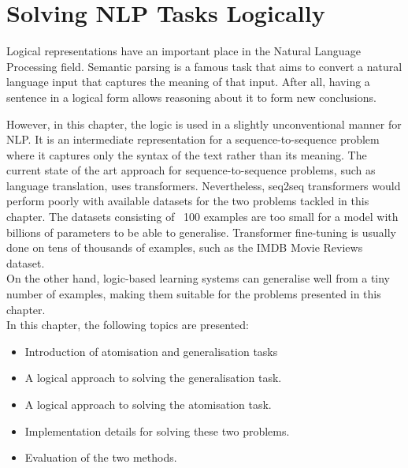 


\chapter{Solving NLP Tasks Logically}


Logical representations have an important place in the Natural Language Processing field.
Semantic parsing \cite{RefWorks:RefID:28-jurafsky2014speech} is a famous task that aims to convert a natural language input that captures the meaning of that input.
After all, having a sentence in a logical form allows reasoning about it to form new conclusions.

However, in this chapter, the logic is used in a slightly unconventional manner for NLP.
It is an intermediate representation for a sequence-to-sequence problem where it captures only the syntax of the text rather than its meaning.
The current state of the art approach for sequence-to-sequence problems, such as language translation, uses transformers. 
Nevertheless, seq2seq transformers would perform poorly with available datasets for the two problems tackled in this chapter.
The datasets consisting of ~100 examples are too small for a model with billions of parameters to be able to generalise.
Transformer fine-tuning is usually done on tens of thousands of examples, such as the IMDB Movie Reviews dataset. \\
On the other hand, logic-based learning systems can generalise well from a tiny number of examples, making them suitable for the problems presented in this chapter. \\


In this chapter, the following topics are presented:
\begin{itemize}
    \item Introduction of atomisation and generalisation tasks
    \item A logical approach to solving the generalisation task.
    \item A logical approach to solving the atomisation task.
    \item Implementation details for solving these two problems.
    \item Evaluation of the two methods.
\end{itemize}




